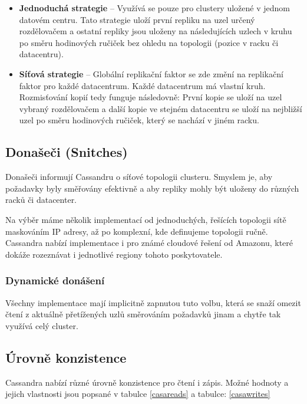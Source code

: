 \begin{itemize}
\item \textbf{Jednoduchá strategie} – Využívá se pouze pro clustery uložené v jednom datovém centru. Tato strategie uloží první repliku na uzel určený rozdělovačem a ostatní repliky jsou uloženy na následujících uzlech v kruhu po směru hodinových ručiček bez ohledu na topologii (pozice v racku či datacentru).
\item \textbf{Síťová strategie} – Globální replikační faktor se zde změní na replikační faktor pro každé datacentrum. Každé datacentrum má vlastní kruh. Rozmisťování kopií tedy funguje následovně: První kopie se uloží na uzel vybraný rozdělovačem a další kopie ve stejném datacentru se uloží na nejbližší uzel po směru hodinových ručiček, který se nachází v jiném racku. 
\end{itemize}

\subsection{Donašeči (Snitches)}
Donašeči informují Cassandru o síťové topologii clusteru. Smyslem je, aby požadavky byly směřovány efektivně a aby repliky mohly být uloženy do různých racků či datacenter. 

Na výběr máme několik implementací od jednoduchých, řešících topologii sítě maskováním IP adresy, až po komplexní, kde definujeme topologii ručně. Cassandra nabízí implementace i pro známé cloudové řešení od Amazonu, které dokáže rozeznávat i jednotlivé regiony tohoto poskytovatele.

\subsubsection{Dynamické donášení}
Všechny implementace mají implicitně zapnutou tuto volbu, která se snaží omezit čtení z aktuálně přetížených uzlů směrováním požadavků jinam a chytře tak využívá celý cluster. 

\subsection{Úrovně konzistence}
Cassandra nabízí různé úrovně konzistence pro čtení i zápis. Možné hodnoty a jejich vlastnosti jsou popsané v tabulce \ref{casareads} a tabulce: \ref{casawrites}


